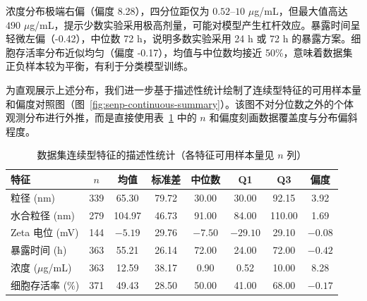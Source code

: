 \documentclass[letterpaper]{article}
\begin{document}
浓度分布极端右偏（偏度 8.28），四分位距仅为 $0.52$--$10$ $\mu$g/mL，但最大值高达 $490$ $\mu$g/mL，提示少数实验采用极高剂量，可能对模型产生杠杆效应。暴露时间呈轻微左偏（-0.42），中位数 72 h，说明多数实验采用 24 h 或 72 h 的暴露方案。细胞存活率分布近似均匀（偏度 -0.17），均值与中位数均接近 50\%，意味着数据集正负样本较为平衡，有利于分类模型训练。

为直观展示上述分布，我们进一步基于描述性统计绘制了连续型特征的可用样本量和偏度对照图（图~\ref{fig:senp-continuous-summary}）。该图不对分位数之外的个体观测分布进行外推，而是直接使用表~\ref{tab:senp_feature_statistics} 中的 $n$ 和偏度刻画数据覆盖度与分布偏斜程度。

\begin{table}[H]
  \centering
  \caption{数据集连续型特征的描述性统计（各特征可用样本量见 $n$ 列）}
  \label{tab:senp_feature_statistics}
  \begin{tabular}{lccccccc}
    \hline
    特征 & $n$ & 均值 & 标准差 & 中位数 & Q1 & Q3 & 偏度 \\
    \hline
    粒径 (nm)            & 339 & 65.30  & 79.72  & 30.00  & 30.00  & 92.15   & 3.92  \\
    水合粒径 (nm)        & 279 & 104.97 & 46.73  & 91.00  & 84.00  & 110.00  & 1.69  \\
    Zeta 电位 (mV)       & 144 & $-5.19$ & 29.76  & $-7.50$ & $-29.10$ & 29.10 & $-0.08$ \\
    暴露时间 (h)         & 363 & 55.21  & 26.14  & 72.00  & 24.00  & 72.00   & $-0.42$ \\
    浓度 ($\mu$g/mL)     & 363 & 12.59  & 38.17  & 0.90   & 0.52   & 10.00   & 8.28  \\
    细胞存活率 (\%)      & 371 & 49.43  & 28.50  & 50.00  & 41.00  & 68.00   & $-0.17$ \\
    \hline
  \end{tabular}
\end{table}
\end{document}
